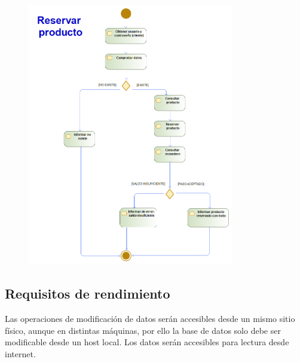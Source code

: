 \begin{figure}[H]
	\centering
	\includegraphics[width=0.8\textwidth]{Use_Cases/reservar_producto.png}
\end{figure}
\newpage
\subsection{Requisitos de rendimiento}
Las operaciones de modificación de datos serán accesibles desde un mismo sitio físico, aunque en distintas máquinas, por ello la base de datos solo debe ser modificable desde un \gls{host} local. Los datos serán accesibles para lectura desde internet.
